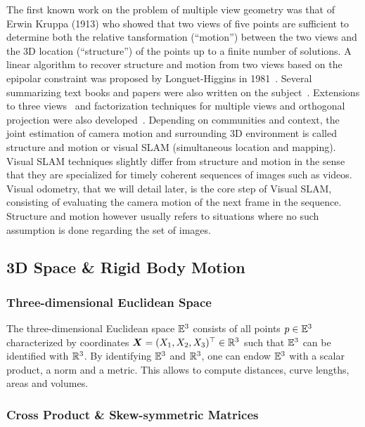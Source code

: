 The first known work on the problem of multiple view geometry was that of
Erwin Kruppa (1913) who showed that two views of five points
are sufficient to determine both the relative tansformation
(``motion'') between the two views and the 3D location (``structure'')
of the points up to a finite number of solutions.
A linear algorithm to recover structure and motion from two views based
on the epipolar constraint was proposed by Longuet-Higgins in 1981~\cite{longuet1981computer}.
Several summarizing text books and papers were also written
on the subject~\cite{faugeras1993three, weng1993optimal}.
Extensions to three views~\cite{spetsakis1987closed, shashua1994trilinearity}
and factorization techniques for multiple views and orthogonal projection were
also developed~\cite{tomasi1992shape}.
Depending on communities and context,
the joint estimation of camera motion and surrounding 3D environment is called
structure and motion or visual SLAM (simultaneous location and mapping).
Visual SLAM techniques slightly differ from structure and motion in the sense
that they are specialized for timely coherent sequences of images such as videos.
Visual odometry, that we will detail later, is the core step of Visual SLAM,
consisting of evaluating the camera motion of the next frame in the sequence.
Structure and motion however usually refers to situations where no such assumption
is done regarding the set of images.

\subsection{3D Space \& Rigid Body Motion}%
\label{sub:3d_space_rigid_body_motion}

\subsubsection{Three-dimensional Euclidean Space}%
\label{ssub:three_dimensional_euclidean_space}

The three-dimensional Euclidean space $\mathbb{E}^3$ consists of all points
$p \in \mathbb{E}^3$ characterized by coordinates
$\bm{X} = (X_1, X_2, X_3)^{\top} \in \mathbb{R}^3$
such that $\mathbb{E}^3$ can be identified with $\mathbb{R}^3$.
By identifying $\mathbb{E}^3$ and $\mathbb{R}^3$,
one can endow $\mathbb{E}^3$ with a scalar product, a norm and a metric.
This allows to compute distances, curve lengths, areas and volumes.


\subsubsection{Cross Product \& Skew-symmetric Matrices}%
\label{ssub:cross_product_and_skew_symmetric_matrices}

